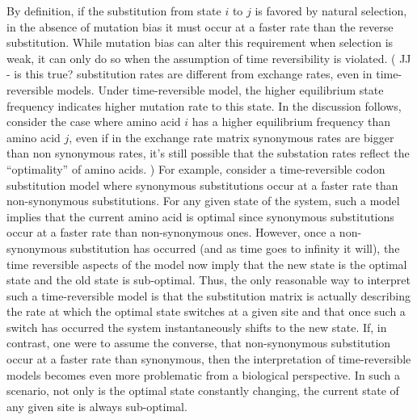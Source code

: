 By definition, if the substitution from state $i$ to $j$ is favored by natural selection, in the absence of mutation bias it must occur at a faster rate than the reverse substitution.
While mutation bias can alter this requirement when selection is weak, it can only do so when the assumption of time reversibility is violated. ({\color{blue} JJ - is this true? substitution rates are different from exchange rates, even in time-reversible models. Under time-reversible model, the higher equilibrium state frequency indicates higher mutation rate to this state. In the discussion follows, consider the case where amino acid $i$ has a higher equilibrium frequency than amino acid $j$, even if in the exchange rate matrix synonymous rates are bigger than non synonymous rates, it's still possible that the substation rates reflect the ``optimality'' of amino acids. } )
For example, consider a time-reversible codon substitution model where synonymous substitutions occur at a faster rate than non-synonymous substitutions.
For any given state of the system, such a model implies that the current amino acid is optimal since synonymous substitutions occur at a faster rate than non-synonymous ones.
However, once a non-synonymous substitution has occurred (and as time goes to infinity it will),  the time reversible aspects of the model now imply that the new state is the optimal state and the old state is sub-optimal.
Thus, the only reasonable way to interpret such a time-reversible model is that the substitution matrix is actually describing the rate at which the optimal state switches at a given site and that once such a switch has occurred the system instantaneously shifts to the new state.
If, in contrast, one were to assume the converse, that non-synonymous substitution occur at a faster rate than synonymous, then the interpretation of time-reversible models becomes even more problematic from a biological perspective.
In such a scenario, not only is the optimal state constantly changing, the current state of any given site is always sub-optimal.


